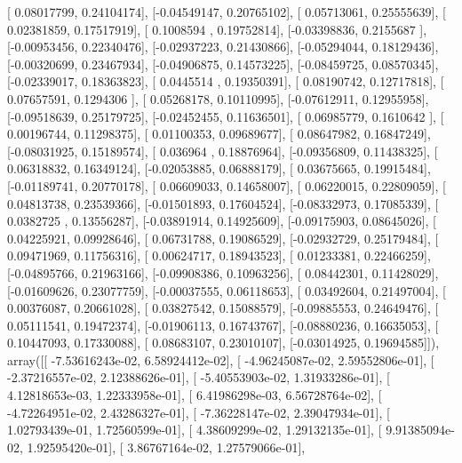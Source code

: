 \documentclass{article}
\begin{document}
       [ 0.08017799,  0.24104174],
       [-0.04549147,  0.20765102],
       [ 0.05713061,  0.25555639],
       [ 0.02381859,  0.17517919],
       [ 0.1008594 ,  0.19752814],
       [-0.03398836,  0.2155687 ],
       [-0.00953456,  0.22340476],
       [-0.02937223,  0.21430866],
       [-0.05294044,  0.18129436],
       [-0.00320699,  0.23467934],
       [-0.04906875,  0.14573225],
       [-0.08459725,  0.08570345],
       [-0.02339017,  0.18363823],
       [ 0.0445514 ,  0.19350391],
       [ 0.08190742,  0.12717818],
       [ 0.07657591,  0.1294306 ],
       [ 0.05268178,  0.10110995],
       [-0.07612911,  0.12955958],
       [-0.09518639,  0.25179725],
       [-0.02452455,  0.11636501],
       [ 0.06985779,  0.1610642 ],
       [ 0.00196744,  0.11298375],
       [ 0.01100353,  0.09689677],
       [ 0.08647982,  0.16847249],
       [-0.08031925,  0.15189574],
       [ 0.036964  ,  0.18876964],
       [-0.09356809,  0.11438325],
       [ 0.06318832,  0.16349124],
       [-0.02053885,  0.06888179],
       [ 0.03675665,  0.19915484],
       [-0.01189741,  0.20770178],
       [ 0.06609033,  0.14658007],
       [ 0.06220015,  0.22809059],
       [ 0.04813738,  0.23539366],
       [-0.01501893,  0.17604524],
       [-0.08332973,  0.17085339],
       [ 0.0382725 ,  0.13556287],
       [-0.03891914,  0.14925609],
       [-0.09175903,  0.08645026],
       [ 0.04225921,  0.09928646],
       [ 0.06731788,  0.19086529],
       [-0.02932729,  0.25179484],
       [ 0.09471969,  0.11756316],
       [ 0.00624717,  0.18943523],
       [ 0.01233381,  0.22466259],
       [-0.04895766,  0.21963166],
       [-0.09908386,  0.10963256],
       [ 0.08442301,  0.11428029],
       [-0.01609626,  0.23077759],
       [-0.00037555,  0.06118653],
       [ 0.03492604,  0.21497004],
       [ 0.00376087,  0.20661028],
       [ 0.03827542,  0.15088579],
       [-0.09885553,  0.24649476],
       [ 0.05111541,  0.19472374],
       [-0.01906113,  0.16743767],
       [-0.08880236,  0.16635053],
       [ 0.10447093,  0.17330088],
       [ 0.08683107,  0.23010107],
       [-0.03014925,  0.19694585]]), array([[ -7.53616243e-02,   6.58924412e-02],
       [ -4.96245087e-02,   2.59552806e-01],
       [ -2.37216557e-02,   2.12388626e-01],
       [ -5.40553903e-02,   1.31933286e-01],
       [  4.12818653e-03,   1.22333958e-01],
       [  6.41986298e-03,   6.56728764e-02],
       [ -4.72264951e-02,   2.43286327e-01],
       [ -7.36228147e-02,   2.39047934e-01],
       [  1.02793439e-01,   1.72560599e-01],
       [  4.38609299e-02,   1.29132135e-01],
       [  9.91385094e-02,   1.92595420e-01],
       [  3.86767164e-02,   1.27579066e-01],
\end{document}
